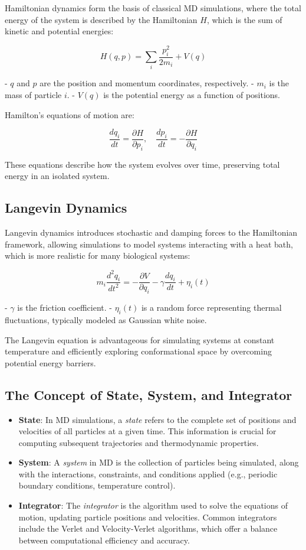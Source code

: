 \documentclass[english,course]{lecture}
\begin{document}
Hamiltonian dynamics form the basis of classical MD simulations, where the total energy of the system is described by the Hamiltonian \(H\), which is the sum of kinetic and potential energies:

\[
H(q, p) = \sum_{i} \frac{p_i^2}{2m_i} + V(q)
\]

- \(q\) and \(p\) are the position and momentum coordinates, respectively.
- \(m_i\) is the mass of particle \(i\).
- \(V(q)\) is the potential energy as a function of positions.

Hamilton's equations of motion are:

\[
\frac{dq_i}{dt} = \frac{\partial H}{\partial p_i}, \quad \frac{dp_i}{dt} = -\frac{\partial H}{\partial q_i}
\]

These equations describe how the system evolves over time, preserving total energy in an isolated system.

\subsection{Langevin Dynamics}

Langevin dynamics introduces stochastic and damping forces to the Hamiltonian framework, allowing simulations to model systems interacting with a heat bath, which is more realistic for many biological systems:

\[
m_i \frac{d^2q_i}{dt^2} = -\frac{\partial V}{\partial q_i} - \gamma \frac{dq_i}{dt} + \eta_i(t)
\]

- \(\gamma\) is the friction coefficient.
- \(\eta_i(t)\) is a random force representing thermal fluctuations, typically modeled as Gaussian white noise.

The Langevin equation is advantageous for simulating systems at constant temperature and efficiently exploring conformational space by overcoming potential energy barriers.

\subsection{The Concept of State, System, and Integrator}

\begin{itemize}
    \item \textbf{State}: In MD simulations, a \emph{state} refers to the complete set of positions and velocities of all particles at a given time. This information is crucial for computing subsequent trajectories and thermodynamic properties.
    
    \item \textbf{System}: A \emph{system} in MD is the collection of particles being simulated, along with the interactions, constraints, and conditions applied (e.g., periodic boundary conditions, temperature control).
    
    \item \textbf{Integrator}: The \emph{integrator} is the algorithm used to solve the equations of motion, updating particle positions and velocities. Common integrators include the Verlet and Velocity-Verlet algorithms, which offer a balance between computational efficiency and accuracy.
\end{itemize}
\end{document}
